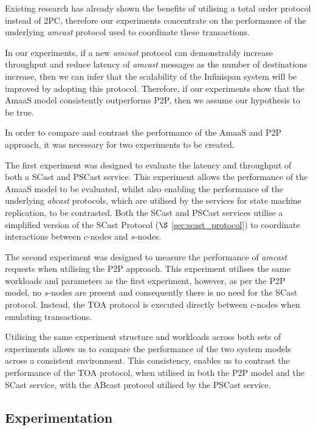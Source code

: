 	Existing research \citep{Ruivo:2011:ETO:2120967.2121604} has already shown the benefits of utilising a total order protocol instead of 2PC, therefore our experiments concentrate on the performance of the underlying \emph{amcast} protocol used to coordinate these transactions.  
	
	In our experiments, if a new \emph{amcast} protocol can demonstrably increase throughput and reduce latency of \emph{amcast} messages as the number of destinations increase,  then we can infer that the scalability of the Infinispan system will be improved by adopting this protocol.  Therefore, if our experiments show that the \textsf{AmaaS} model consistently outperforms P2P, then we assume our hypothesis to be true. 
	
   In order to compare and contrast the performance of the \textsf{AmaaS} and P2P approach, it was necessary for two experiments to be created.  
   
   The first experiment was designed to evaluate the latency and throughput of both a \textsf{SCast} and \textsf{PSCast} service.  This experiment allows the performance of the \textsf{AmaaS} model to be evaluated, whilst also enabling the performance of the underlying \emph{abcast} protocols, which are utilised by the services for state machine replication, to be contrasted.  Both the \textsf{SCast} and \textsf{PSCast} services utilise a simplified version of  the \textsf{SCast} Protocol ($\S$ \ref{sec:scast_protocol}) to coordinate interactions between $c$-nodes and $s$-nodes.  

   The second experiment was designed to measure the performance of \emph{amcast} requests when utilising the P2P approach.  This experiment utilises the same workloads and parameters as the first experiment, however, as per the P2P model, no $s$-nodes are present and consequently there is no need for the \textsf{SCast} protocol.  Instead, the TOA protocol is executed directly between $c$-nodes when emulating transactions.  
   
   Utilising the same experiment structure and workloads across both sets of experiments allows us to compare the performance of the two system models across a consistent environment.  This consistency, enables us to contrast the performance of the TOA protocol, when utilised in both the P2P model and the \textsf{SCast} service, with the \textsf{ABcast} protocol utilised by the \textsf{PSCast} service.  

	\subsection{Experimentation}\label{ssec:emulated_transaction_experiments}

